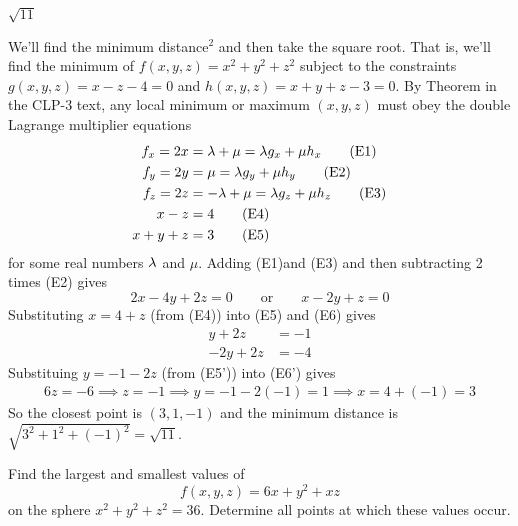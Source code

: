 %

\begin{answer}
$\sqrt{11}$
\end{answer}

\begin{solution}
We'll find the minimum distance$^2$ and then take the square root.
That is, we'll find the minimum of $f(x,y,z)=x^2+y^2+z^2$ subject to 
the constraints 
$g(x,y,z)=x-z-4=0$ and $h(x,y,z) = x + y + z -3=0$.
By Theorem  in the CLP-3 text, 
any local minimum or maximum $(x,y,z)$ must obey the  double Lagrange 
multiplier equations
\begin{align*}
f_x = 2x &=\lambda + \mu  = \lambda g_x +\mu h_x\tag{E1} \\ 
f_y = 2y &= \mu = \lambda g_y +\mu h_y\tag{E2} \\ 
f_z = 2z &=-\lambda + \mu  = \lambda g_z +\mu h_z\tag{E3} \\ 
x - z &= 4\tag{E4} \\
x + y + z &= 3 \tag{E5}
\end{align*}
for some real numbers $\lambda$ and $\mu$. 
Adding (E1)and (E3) and then subtracting 2 times (E2) gives
\begin{equation*}
2x-4y+2z=0\qquad\text{or}\qquad
x-2y+z=0
\tag{E6}\end{equation*}
Substituting $x=4+z$ (from (E4)) into (E5) and (E6) gives
\begin{align*}
y+2z&=-1   \tag{E5'}\\
-2y+2z&=-4 \tag{E6'}
\end{align*}
Substituing $y=-1-2z$ (from (E5')) into (E6') gives
\begin{align*}
 6z =-6
\implies z=-1
\implies y=-1-2(-1)=1 
\implies x=4+(-1)=3
\end{align*}
So the closest point is $(3,1,-1)$ and the minimum
distance is $\sqrt{3^2+1^2+(-1)^2}=\sqrt{11}$.
\end{solution}

\begin{question}[M200 2014A] %
Find the largest and smallest values of
\begin{equation*}
f(x,y,z) = 6x + y^2 + xz
\end{equation*}
on the sphere $x^2 + y^2 + z^2 = 36$. Determine all points at which 
these values occur.
\end{question}

%

